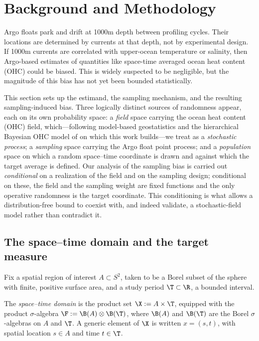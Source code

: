 \section{Background and Methodology}
\label{sec:methodology}

Argo floats park and drift at 1000m depth between profiling cycles.
Their locations are determined by currents at that depth, not by experimental design.
If 1000m currents are correlated with upper-ocean temperature or salinity, then Argo-based estimates of quantities like space-time averaged ocean heat content (OHC) could be biased.
This is widely suspected to be negligible, but the magnitude of this bias has not yet been bounded statistically.

This section sets up the estimand, the sampling mechanism, and the resulting sampling-induced bias.
Three logically distinct sources of randomness appear, each on its own probability space: a \emph{field} space carrying the ocean heat content (OHC) field, which---following model-based geostatistics and the hierarchical Bayesian OHC model of \citet{baugh2022} on which this work builds---we treat as a \emph{stochastic process}; a \emph{sampling} space carrying the Argo float point process; and a \emph{population} space on which a random space--time coordinate is drawn and against which the target average is defined.
Our analysis of the sampling bias is carried out \emph{conditional} on a realization of the field and on the sampling design; conditional on these, the field and the sampling weight are fixed functions and the only operative randomness is the target coordinate.
This conditioning is what allows a distribution-free bound to coexist with, and indeed validate, a stochastic-field model rather than contradict it.

\subsection{The space--time domain and the target measure}
\label{sec:domain}

Fix a spatial region of interest $A \subset S^{2}$, taken to be a
Borel subset of the sphere with finite, positive surface area, and a
study period $\T \subset \R$, a bounded interval.

\begin{definition}
\label{def:domain}
The \emph{space--time domain} is the product set
$\X := A \times \T$, equipped with the product $\sigma$-algebra
$\F := \B(A)\otimes\B(\T)$, where $\B(A)$ and $\B(\T)$ are the Borel
$\sigma$-algebras on $A$ and $\T$. A generic element of $\X$ is written
$x = (s,t)$, with spatial location $s \in A$ and time $t \in \T$.
\end{definition}

